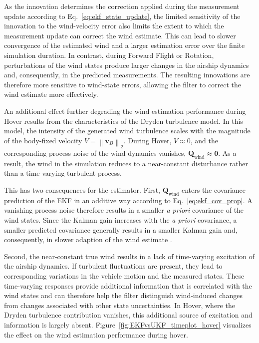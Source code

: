 As the innovation determines the correction applied during the measurement update according to Eq.~\eqref{eq:ekf_state_update}, the limited sensitivity of the innovation to the wind-velocity error also limits the extent to which the measurement update can correct the wind estimate. 
This can lead to slower convergence of the estimated wind and a larger estimation error over the finite simulation duration. In contrast, during Forward Flight or Rotation, perturbations of the wind states produce larger changes in the airship dynamics and, consequently, in the predicted measurements. The resulting innovations are therefore more sensitive to wind-state errors, allowing the filter to correct the wind estimate more effectively.

An additional effect further degrading the wind estimation performance during Hover results from the characteristics of the Dryden turbulence model. In this model, the intensity of the generated wind turbulence scales with the magnitude of the body-fixed velocity $V = \left\|\bm{v}_B\right\|_2$. During Hover, $V \approx 0$, and the corresponding process noise of the wind dynamics vanishes, $\bm{Q}_\mathrm{wind} \approx \bm{0}$. As a result, the wind in the simulation reduces to a near-constant disturbance rather than a time-varying turbulent process.

This has two consequences for the estimator. First, $\bm{Q}_\mathrm{wind}$ enters the covariance prediction of the EKF in an additive way according to Eq.~\eqref{eq:ekf_cov_prop}. A vanishing process noise therefore results in a smaller \emph{a priori} covariance of the wind states. 
Since the Kalman gain increases with the \emph{a priori} covariance, a smaller predicted covariance generally results in a smaller Kalman gain and, consequently, in slower adaption of the wind estimate \cite{Maybeck1979KF}.

Second, the near-constant true wind results in a lack of time-varying excitation of the airship dynamics. If turbulent fluctuations are present, they lead to corresponding variations in the vehicle motion and the measured states. These time-varying responses provide additional information that is correlated with the wind states and can therefore help the filter distinguish wind-induced changes from changes associated with other state uncertainties. In Hover, where the Dryden turbulence contribution vanishes, this additional source of excitation and information is largely absent. Figure~\ref{fig:EKFvsUKF_timeplot_hover} visualizes the effect on the wind estimation performance during hover. 

